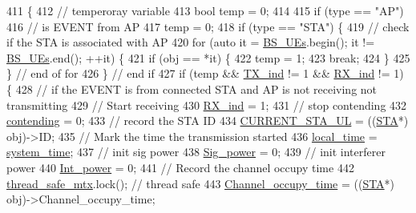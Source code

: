\begin{DoxyCode}
411                                               \{
412     \textcolor{comment}{// temperoray variable}
413     \textcolor{keywordtype}{bool} temp = 0;
414 
415     \textcolor{keywordflow}{if} (type == \textcolor{stringliteral}{"AP"})
416         \textcolor{comment}{// is EVENT from AP}
417         temp = 0;
418     \textcolor{keywordflow}{if} (type == \textcolor{stringliteral}{"STA"}) \{
419         \textcolor{comment}{// check if the STA is associated with AP}
420         \textcolor{keywordflow}{for} (\textcolor{keyword}{auto} it = \hyperlink{classAP_ab4709e5956576b8131ae0c63af5c1151}{BS\_UEs}.begin(); it != \hyperlink{classAP_ab4709e5956576b8131ae0c63af5c1151}{BS\_UEs}.end(); ++it) \{
421             \textcolor{keywordflow}{if} (obj == *it) \{
422                 temp = 1;
423                 \textcolor{keywordflow}{break};
424             \}
425         \} \textcolor{comment}{// end of for}
426     \} \textcolor{comment}{// end if}
427     \textcolor{keywordflow}{if} (temp && \hyperlink{classAP_adce53b419ff50565a7084b8d893c5be1}{TX\_ind} != 1 && \hyperlink{classAP_af5b1c2bc10a9ce9f3007bbf37f95f144}{RX\_ind} != 1) \{
428         \textcolor{comment}{// if the EVENT is from connected STA and AP is not receiving not transmitting}
429         \textcolor{comment}{// Start receiving}
430         \hyperlink{classAP_af5b1c2bc10a9ce9f3007bbf37f95f144}{RX\_ind} = 1;
431         \textcolor{comment}{// stop contending}
432         \hyperlink{classAP_afe722094c1dea7972332a788411cc488}{contending} = 0;
433         \textcolor{comment}{// record the STA ID}
434         \hyperlink{classAP_a78174ebdb27995f7dce372fc78f3e486}{CURRENT\_STA\_UL} = ((\hyperlink{classSTA}{STA}*) obj)->ID;
435         \textcolor{comment}{// Mark the time the transmission started}
436         \hyperlink{classAP_ab31a52cd05ca5daf9ccd5d24941fe395}{local\_time} = \hyperlink{AP_8cpp_aaa03a568dc1d9d3391286ea24b9cfb63}{system\_time};
437         \textcolor{comment}{// init sig power}
438         \hyperlink{classAP_a39256449e3187dd7b8bdd1cfa0fbb2da}{Sig\_power} = 0;
439         \textcolor{comment}{// init interferer power}
440         \hyperlink{classAP_a6c2c3e61c88d4bba7d949f5663b3ea10}{Int\_power} = 0;
441         \textcolor{comment}{// Record the channel occupy time}
442         \hyperlink{AP_8cpp_aaa6351021119738f7a064778438f782c}{thread\_safe\_mtx}.lock(); \textcolor{comment}{// thread safe}
443         \hyperlink{classAP_a2c168786c0400fa590bed7fabbca741e}{Channel\_occupy\_time} = ((\hyperlink{classSTA}{STA}*) obj)->Channel\_occupy\_time;

\end{DoxyCode}
